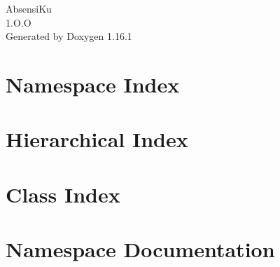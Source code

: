 \documentclass[twoside]{book}
\newcommand{\+}{\discretionary{\mbox{\scriptsize$\hookleftarrow$}}{}{}}
\newcommand{\clearemptydoublepage}{%
    \newpage{\pagestyle{empty}\cleardoublepage}%
  }
\begin{document}
  \raggedbottom
    \hypersetup{pageanchor=false,
                bookmarksnumbered=true,
                pdfencoding=unicode
               }
  \begin{titlepage}
  \vspace*{7cm}
  \begin{center}%
  {\Large Absensi\+Ku}\\
  [1ex]\large 1.\+O.\+O \\
  \vspace*{1cm}
  {\large Generated by Doxygen 1.16.1}\\
  \end{center}
  \end{titlepage}
  \clearemptydoublepage
  \tableofcontents
  \clearemptydoublepage
  \hypersetup{pageanchor=true}
\chapter{Namespace Index}

\chapter{Hierarchical Index}

\chapter{Class Index}

\chapter{Namespace Documentation}

\end{document}
